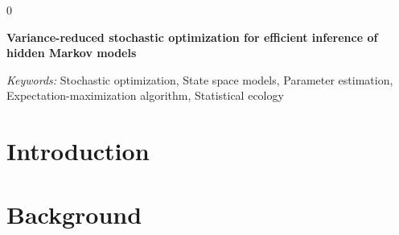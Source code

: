\documentclass[12pt]{article}
\newcommand{\blind}{0}
\begin{document}
\blind
{
  \bigskip
  \bigskip
  \bigskip
  \begin{center}
    {\LARGE\bf Variance-reduced stochastic optimization for efficient inference of hidden Markov models}
  \end{center}
  \medskip
} \fi

\bigskip
\begin{abstract}
    Hidden Markov models (HMMs) are popular models often used to identify a finite number of discrete latent states from sequential data. However, fitting them to large data sets can be computationally demanding as it usually requires iterating through the entire data set for every parameter update. Specifically, numerical optimization methods involve a full pass of the data to evaluate the gradient of the likelihood, and the expectation-maximization (EM) algorithm requires a full pass of the data to perform its E step. The EM algorithm also requires numerical optimization for the M step if no closed-form solution exists. We propose an optimization algorithm that updates the parameters of an HMM without iterating through the entire data set. Namely, we implement a partial E step and combine it within a variance-reduced stochastic optimization scheme for the M step. We prove that our algorithm converges under certain regularity conditions. Using a simulation study and kinematic data from eight killer whales ({\em{Orcinus orca}}) off the western coast of Canada, we show that our algorithm converges in fewer epochs compared to standard numerical optimization techniques. Our algorithm also tends to converge to parameters estimates with higher likelihood compared to existing baselines.  As such, our algorithm allows practitioners to more efficiently fit complicated HMMs to increasingly large time-series data sets.
\end{abstract}

\noindent%
{\it Keywords:} Stochastic optimization, State space models, Parameter estimation, Expectation-maximization algorithm, Statistical ecology%
\vfill 

\newpage
{} %

\section{Introduction}


\section{Background}

\end{document}
